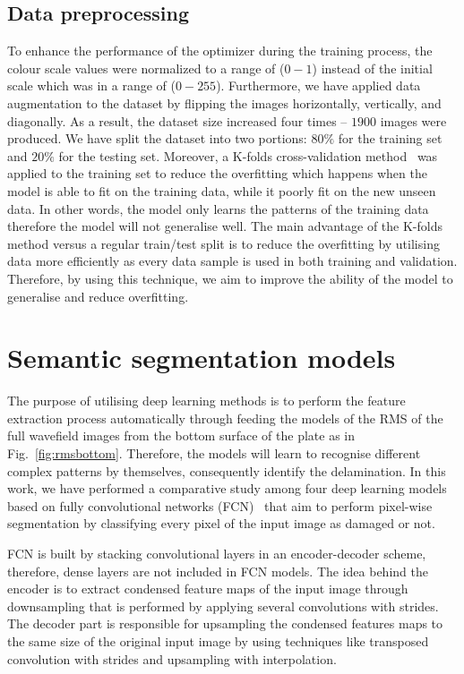 \documentclass[runningheads]{llncs}
\begin{document}
\subsection{Data preprocessing}
To enhance the performance of the optimizer during the training process, the colour scale values were normalized to a range of (\(0-1\)) instead of the initial scale which was in a range of (\(0 - 255\)).	
Furthermore, we have applied data augmentation to the dataset by flipping the images horizontally, vertically, and diagonally. 
As a result, the dataset size increased four times -- \(1900\)  images were produced.
We have split the dataset into two portions:  \(80\%\) for the training set and \(20\%\) for the testing set.
Moreover, a K-folds cross-validation method~\cite{Srinivasan2019} was applied to the training set to reduce the overfitting which happens when the model is able to fit on the training data, while it poorly fit on the new unseen data.
In other words, the model only learns the patterns of the training data therefore the model will not generalise well. 
The main advantage of the K-folds method versus a regular train/test split is to reduce the overfitting by utilising data more efficiently as every data sample is used in both training and validation. 
Therefore, by using this technique, we aim to improve the ability of the model to generalise and reduce overfitting.
\section{Semantic segmentation models}
\label{section:semantic_segmentation}
The purpose of utilising deep learning methods is to perform the feature extraction process automatically through feeding the models  of the RMS of the full wavefield images from the bottom surface of the plate as in Fig.~\ref{fig:rmsbottom}.
Therefore, the models will learn to recognise different complex patterns by themselves, consequently identify the delamination. 
In this work, we have performed a comparative study among four deep learning models based on fully convolutional networks (FCN)~\cite{shelhamer2017fully} that aim to perform pixel-wise segmentation by classifying every pixel of the input image as damaged or not. 

FCN is built by stacking convolutional layers in an encoder-decoder scheme, therefore, dense layers are not included in FCN models. 
The idea behind the encoder is to extract condensed feature maps of the input image through downsampling that is performed by applying several convolutions with strides.
The decoder part is responsible for upsampling the condensed features maps to the same size of the original input image by using techniques like transposed convolution with strides and upsampling with interpolation.
\end{document}

